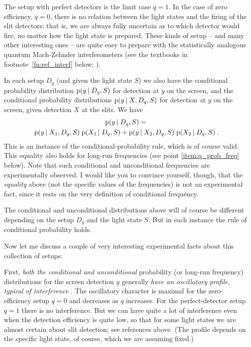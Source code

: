 \documentclass[\ifafour a4paper,12pt,\else a5paper,10pt,\fi%
onecolumn,oneside,article,%
british%
]{memoir}
\theoremstyle{remark}
\theoremstyle{innote}
\newcommand*{\citep}{\parencites}%
\newcommand*{\pf}{\mathrm{p}}%
\renewcommand*{\|}[1][]{\nonscript\,#1\vert\nonscript\;\mathopen{}}
\newcommand*{\sect}{\S}%
\newcommand*{\yxa}{X_{1}}
\newcommand*{\yxb}{X_{2}}
\newcommand*{\yDq}{D_{q}}
\begin{document}
The setup with perfect detectors is the limit case $q=1$. In the case of
zero efficiency, $q=0$, there is no relation between the light states and
the firing of the slit detectors; that is, we are always fully uncertain as
to which detector would fire, no matter how the light state is prepared.
These kinds of setup -- and many other interesting ones -- are quite easy
to prepare with the statistically analogous quantum Mach-Zehnder
interferometers (see the textbooks in footnote~\ref{fn:ref_interf} below;
\cites[\sect~4.2]{leonhardt1997}{yuenetal1978}).
  
In each setup $\yDq$ (and given the light state $S$) we also have the
conditional probability distribution $\pf(y \| \yDq,S)$ for detection at
$y$ on the screen, and the conditional probability distributions
$\pf(y \| X,\yDq,S)$ for detection at $y$ on the screen, given detection
$X$ at the slits. We have
\begin{multline}
  \label{eq:conditional_q}
  \pf(y \| \yDq, S) ={}\\
  \pf(y \| \yxa, \yDq, S) \;\pf( \yxa \| \yDq, S) +
  \pf(y \| \yxb, \yDq, S) \;\pf( \yxb \| \yDq, S) \;.
\end{multline}
This is an instance of the conditional-probability rule, which is of course
valid. This equality also holds for long-run frequencies (see point
\ref{item:q_prob_freq} below). Note that such conditional and unconditional
frequencies are experimentally observed. I would like you to convince
yourself, though, that the \emph{equality} above (not the specific values
of the frequencies) is not an experimental fact, since it rests on the very
definition of conditional frequency.

The conditional and unconditional distributions above will of course be
different depending on the setup $\yDq$ and the light state $S$. But in
each instance the rule of conditional probability holds.

\medskip

Now let me discuss a couple of very interesting experimental facts about
this collection of setups:

First, \emph{both the conditional and unconditional} probability (or
long-run frequency) distributions for the screen detection $y$ generally
\emph{have an oscillatory profile, typical of interference}
\citep{woottersetal1979,banaszeketal2013}[see also][for further
variations]{chiaoetal1995}. The oscillatory character is maximal for the
zero-efficiency setup $q=0$ and decreases as $q$ increases. For the
perfect-detector setup $q=1$ there is no interference. But we can have
quite a lot of interference even when the detection efficiency is quite
low, so that for some light states we are almost certain about slit
detection; see references above. (The profile depends on the specific light
state, of course, which we are assuming fixed.)
  
\end{document}
